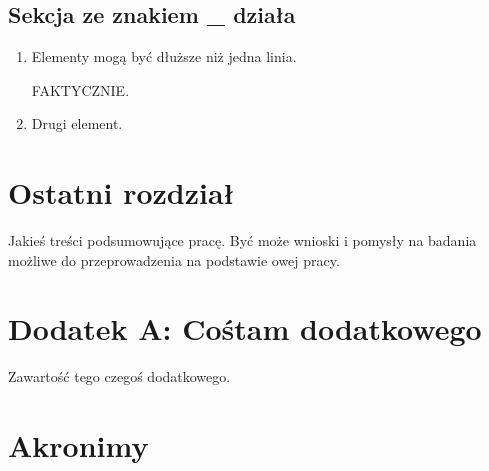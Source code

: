 \documentclass[12pt,a4paper,leqno,oneside,titlepage]{book}
\begin{document}


\section{Sekcja ze znakiem \_ działa}

\begin{enumerate}
\item Elementy mogą być dłuższe niż jedna linia.

FAKTYCZNIE.

\item Drugi element.

\end{enumerate}

\chapter{Ostatni rozdział}

Jakieś treści podsumowujące pracę. Być może wnioski i pomysły na badania możliwe do przeprowadzenia na podstawie owej pracy.

\newpage



\appendix
{}

\chapter*{Dodatek A: Cośtam dodatkowego}

Zawartość tego czegoś dodatkowego.

\chapter*{Akronimy}
\begin{acronym}
\end{acronym}
\end{document}
